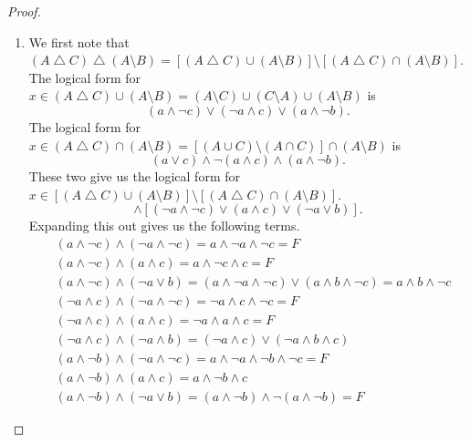 \documentclass[12pt]{amsart}
\theoremstyle{definition}
\theoremstyle{remark}
\begin{document}
\begin{proof}
\begin{enumerate}
	\item We first note that $(A \bigtriangleup C) \bigtriangleup (A \setminus B) = [(A \bigtriangleup C) \cup (A \setminus B)] \setminus [(A \bigtriangleup C) \cap (A \setminus B)]$.
	The logical form for $x \in (A \bigtriangleup C) \cup (A \setminus B) = (A \setminus C) \cup (C \setminus A) \cup (A \setminus B)$ is
	\begin{equation*}
		(a \wedge \neg c) \vee (\neg a \wedge c) \vee (a \wedge \neg b).
	\end{equation*}
	The logical form for $x \in (A \bigtriangleup C) \cap (A \setminus B) = [(A \cup C) \setminus (A \cap C)] \cap (A \setminus B)$ is
	\begin{equation*}
		(a \vee c) \wedge \neg (a \wedge c) \wedge (a \wedge \neg b).
	\end{equation*}
	These two give us the logical form for $x \in [(A \bigtriangleup C) \cup (A \setminus B)] \setminus [(A \bigtriangleup C) \cap (A \setminus B)]$.
	\begin{equation*}
		[(a \wedge \neg c) \vee (\neg a \wedge c) \vee (a \wedge \neg b)]
		\wedge [(\neg a \wedge \neg c) \vee (a \wedge c) \vee (\neg a \vee b)].
	\end{equation*}
	Expanding this out gives us the following terms.
	\begin{align*}
		& (a \wedge \neg c) \wedge (\neg a \wedge \neg c) = a \wedge \neg a \wedge \neg c = F \\
		& (a \wedge \neg c) \wedge (a \wedge c) = a \wedge \neg c \wedge c = F \\
		& (a \wedge \neg c) \wedge (\neg a \vee b) 
			= (a \wedge \neg a \wedge \neg c) \vee (a \wedge b \wedge \neg c)
			= a \wedge b \wedge \neg c \\
		& (\neg a \wedge c) \wedge (\neg a \wedge \neg c) = \neg a \wedge c \wedge \neg c = F \\
		& (\neg a \wedge c) \wedge (a \wedge c) = \neg a \wedge a \wedge c = F \\
		& (\neg a \wedge c) \wedge (\neg a \wedge b) 
			= (\neg a \wedge c) \vee (\neg a \wedge b \wedge c) \\
		& (a \wedge \neg b) \wedge (\neg a \wedge \neg c) 
		= a \wedge \neg a \wedge \neg b \wedge \neg c = F \\
		& (a \wedge \neg b) \wedge (a \wedge c) = a \wedge \neg b \wedge c \\
		& (a \wedge \neg b) \wedge (\neg a \vee b) 
			= (a \wedge \neg b) \wedge \neg (a \wedge \neg b) = F
	\end{align*}

\end{enumerate}
\end{proof}
\end{document}
